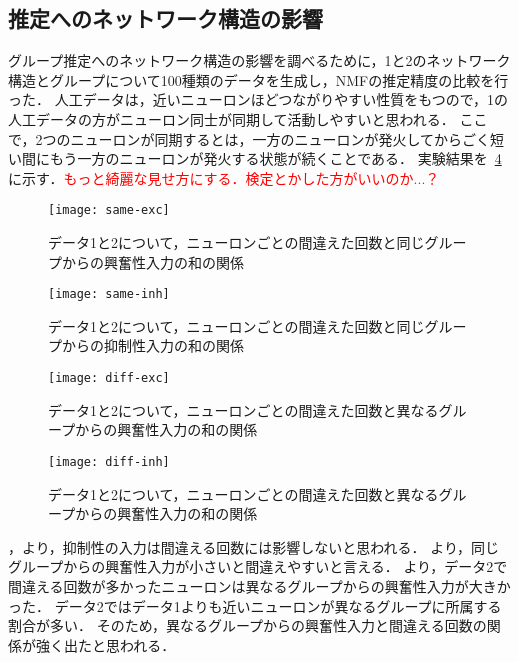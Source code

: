 \subsection{推定へのネットワーク構造の影響}
グループ推定へのネットワーク構造の影響を調べるために，1と2のネットワーク構造とグループについて100種類のデータを生成し，NMFの推定精度の比較を行った．
人工データは，近いニューロンほどつながりやすい性質をもつので，1の人工データの方がニューロン同士が同期して活動しやすいと思われる．
ここで，2つのニューロンが同期するとは，一方のニューロンが発火してからごく短い間にもう一方のニューロンが発火する状態が続くことである．
実験結果を~\ref{fig:diff-inh}に示す．\textcolor{red}{もっと綺麗な見せ方にする．検定とかした方がいいのか...？}
\begin{figure}[htbp]
    \begin{center}
        \texttt{[image: same-exc]}
        \caption{データ1と2について，ニューロンごとの間違えた回数と同じグループからの興奮性入力の和の関係}
        \label{fig:same-exc}
    \end{center}
\end{figure}
\begin{figure}[htbp]
    \begin{center}
      \texttt{[image: same-inh]}
        \caption{データ1と2について，ニューロンごとの間違えた回数と同じグループからの抑制性入力の和の関係}
        \label{fig:same-inh}
    \end{center}
\end{figure}
\begin{figure}[htbp]
    \begin{center}
        \texttt{[image: diff-exc]}
        \caption{データ1と2について，ニューロンごとの間違えた回数と異なるグループからの興奮性入力の和の関係}
        \label{fig:diff-exc}
    \end{center}
\end{figure}
\begin{figure}[htbp]
    \begin{center}
        \texttt{[image: diff-inh]}
        \caption{データ1と2について，ニューロンごとの間違えた回数と異なるグループからの興奮性入力の和の関係}
        \label{fig:diff-inh}
    \end{center}
\end{figure}
，より，抑制性の入力は間違える回数には影響しないと思われる．
より，同じグループからの興奮性入力が小さいと間違えやすいと言える．
より，データ2で間違える回数が多かったニューロンは異なるグループからの興奮性入力が大きかった．
データ2ではデータ1よりも近いニューロンが異なるグループに所属する割合が多い．
そのため，異なるグループからの興奮性入力と間違える回数の関係が強く出たと思われる．

